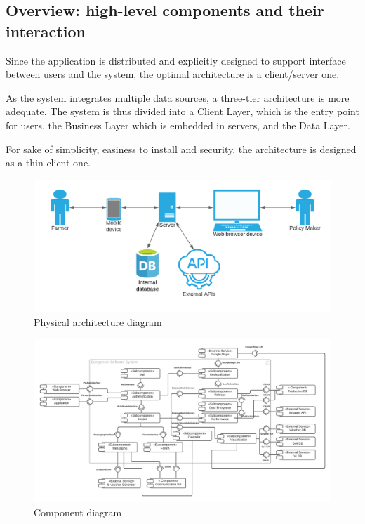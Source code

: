 \subsection{Overview: high-level components and their interaction}

Since the application is distributed and explicitly designed to support interface between users and the system, the optimal architecture is a client/server one. 

As the system integrates multiple data sources, a three-tier architecture is more adequate. The system is thus divided into a Client Layer, which is the entry point for users, the Business Layer which is embedded in servers, and the Data Layer. 

For sake of simplicity, easiness to install and security, the architecture is designed as a thin client one.

\begin{figure} [!h]
	\centering
	\includegraphics[width=\textwidth]{Images/architecture-diagram.png}
	\caption{\label{fig:seq} Physical architecture diagram}
\end{figure}

\begin{figure} [!h]
	\centering
	\includegraphics[width=\textwidth]{Images/component-diagram.png}
	\caption{\label{fig:seq} Component diagram}
\end{figure}